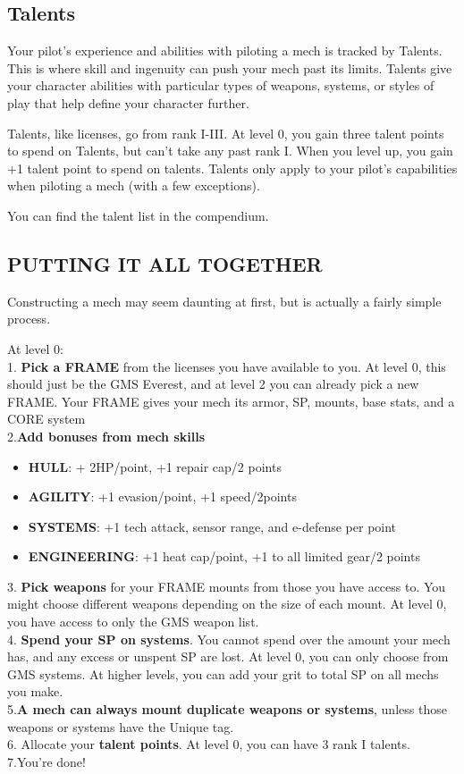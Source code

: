 \subsection{Talents}

Your pilot’s experience and abilities with piloting a mech is tracked by Talents. This is where skill and ingenuity can push your mech past its limits. Talents give your character abilities with particular types of weapons, systems, or styles of play that help define your character further. 

Talents, like licenses, go from rank I-III. At level 0, you gain three talent points to spend on Talents, but can’t take any past rank I. When you level up, you gain +1 talent point to spend on talents. Talents only apply to your pilot’s capabilities when piloting a mech (with a few exceptions). 

You can find the talent list in the compendium.

\subsection*{PUTTING IT ALL TOGETHER}

Constructing a mech may seem daunting at first, but is actually a fairly simple process.

At level 0:\\
1. \textbf{Pick a FRAME} from the licenses you have available to you. At level 0, this should just be the GMS Everest, and at level 2 you can already pick a new FRAME. Your FRAME gives your mech its armor, SP, mounts, base stats, and a CORE system\\
2.\textbf{Add bonuses from mech skills}
\begin{itemize}
\item \textbf{HULL}: + 2HP/point, +1 repair cap/2 points
\item \textbf{AGILITY}: +1 evasion/point, +1 speed/2points
\item \textbf{SYSTEMS}: +1 tech attack, sensor range, and e-defense per point
\item \textbf{ENGINEERING}: +1 heat cap/point, +1 to all limited gear/2 points
\end{itemize}
3. \textbf{Pick weapons} for your FRAME mounts from those you have access to. You might choose different weapons depending on the size of each mount. At level 0, you have access to only the GMS weapon list.\\
4. \textbf{Spend your SP on systems}. You cannot spend over the amount your mech has, and any excess or unspent SP are lost. At level 0, you can only choose from GMS systems. At higher levels, you can add your grit to total SP on all mechs you make.\\
5.\textbf{A mech can always mount duplicate weapons or systems}, unless those weapons or systems have the Unique tag.\\
6. Allocate your \textbf{talent points}. At level 0, you can have 3 rank I talents.
7.You’re done!

